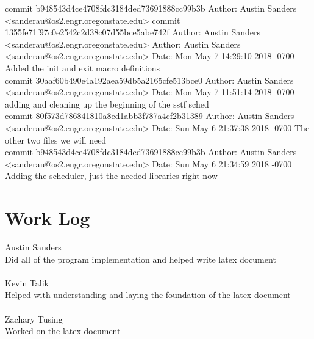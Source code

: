 \documentclass[onecolumn, draftclsnofoot,10pt, compsoc]{IEEEtran}
\begin{document}
{commit b948543d4ce4708fdc3184ded73691888cc99b3b
Author: Austin Sanders <sanderau@os2.engr.oregonstate.edu>
commit 1355fe71f97c0e2542c2d38c07d55bce5abe742f
Author: Austin Sanders <sanderau@os2.engr.oregonstate.edu>
Author: Austin Sanders <sanderau@os2.engr.oregonstate.edu>
Date:   Mon May 7 14:29:10 2018 -0700
Added the init and exit macro definitions\\

commit 30aaf60b490e4a192aea59db5a2165cfe513bce0
Author: Austin Sanders <sanderau@os2.engr.oregonstate.edu>
Date:   Mon May 7 11:51:14 2018 -0700
adding and cleaning up the beginning of the sstf sched\\

commit 80f573d786841810a8ed1abb3f787a4cf2b31389
Author: Austin Sanders <sanderau@os2.engr.oregonstate.edu>
Date:   Sun May 6 21:37:38 2018 -0700
The other two files we will need\\

commit b948543d4ce4708fdc3184ded73691888cc99b3b
Author: Austin Sanders <sanderau@os2.engr.oregonstate.edu>
Date:   Sun May 6 21:34:59 2018 -0700
Adding the scheduler, just the needed libraries right now\\
}

\section{Work Log}

Austin Sanders\\ 
Did all of the program implementation and helped write latex document\\
\\
Kevin Talik\\
Helped with understanding and laying the foundation of the latex document\\
\\
Zachary Tusing\\
Worked on the latex document
\\

		
        
        
        
\end{document}
